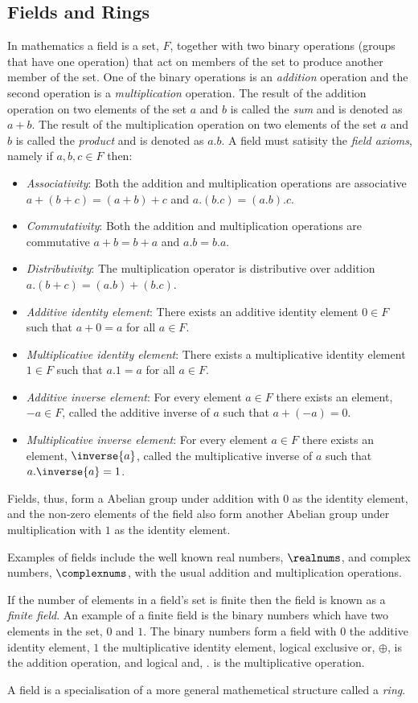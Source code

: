 \subsection{Fields and Rings}
\label{subsec:MathsAlgebraFieldsRings}

In mathematics a field is a set, $F$, together with two binary operations
(\cf groups that have one operation) that act on members of the set to
produce another member of the set. One of the binary operations is an
\emph{addition} operation and the second operation is a
\emph{multiplication} operation. The result of the addition operation
on two elements of the set $a$ and $b$ is called the \emph{sum} and is
denoted as $a+b$. The result of the multiplication operation on two
elements of the set $a$ and $b$ is called the \emph{product} and is
denoted as $a.b$. A field must satisity the \emph{field axioms}, namely if $a,b,c\in F$ then:
\begin{itemize}
\item \emph{Associativity}: Both the addition and multiplication operations are associative \ie $a+(b+c)=(a+b)+c$ and $a.(b.c)=(a.b).c$.
\item \emph{Commutativity}: Both the addition and multiplication operations are commutative \ie $a+b=b+a$ and $a.b=b.a$.
\item \emph{Distributivity}: The multiplication operator is distributive over addition \ie $a.(b+c)=(a.b)+(b.c)$.
\item \emph{Additive identity element}: There exists an additive identity element $0\in F$ such that $a+0=a$ for all $a\in F$.
\item \emph{Multiplicative identity element}: There exists a multiplicative identity element $1\in F$ such that $a.1=a$ for all $a\in F$.
\item \emph{Additive inverse element}: For every element $a\in F$ there exists an element, $-a\in F$, called the additive inverse of $a$ such that $a+(-a)=0$.
\item \emph{Multiplicative inverse element}: For every element $a\in F$ there exists an element, $\inverse{a}$, called the multiplicative inverse of $a$ such that $a.\inverse{a}=1$.
\end{itemize}

Fields, thus, form a Abelian group under addition with $0$ as the
identity element, and the non-zero elements of the field also form
another Abelian group under multiplication with $1$ as the identity
element.

Examples of fields include the well known real numbers, $\realnums$,
and complex numbers, $\complexnums$, with the usual addition and
multiplication operations.

If the number of elements in a field's set is finite then the field is
known as a \emph{finite field}. An example of a finite field is the
binary numbers which have two elements in the set, $0$ and $1$. The
binary numbers form a field with $0$ the additive identity element,
$1$ the multiplicative identity element, logical exclusive or,
$\oplus$, is the addition operation, and logical and, $.$ is the
multiplicative operation.

A field is a specialisation of a more general mathemetical structure called a \emph{ring}. 


